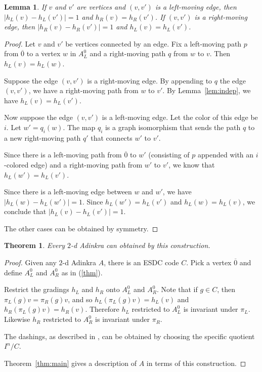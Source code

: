 \documentclass[12pt,twoside,singlespace]{article}
\numberwithin{equation}{section}
\newtheorem{thm}[equation]{Theorem}
\newtheorem{lem}[equation]{Lemma}
\theoremstyle{definition}
\begin{document}
\begin{lem}
If $v$ and $v'$ are vertices and $(v,v')$ is a left-moving edge, then
$|h_L(v)-h_L(v')|=1$ and $h_R(v)=h_R(v')$.  If $(v,v')$ is a right-moving edge, then $|h_R(v)-h_R(v')|=1$ and $h_L(v)=h_L(v')$.
\end{lem}

\begin{proof}
Let $v$ and $v'$ be vertices connected by an edge.  Fix a left-moving path $p$ from $\overline{0}$ to a vertex $w$ in $A_L^0$ and a right-moving path $q$ from $w$ to $v$.  Then $h_L(v)=h_L(w)$.

Suppose the edge $(v,v')$ is a right-moving edge.  By appending to $q$ the edge $(v,v')$, we have a right-moving path from $w$ to $v'$.  By Lemma~\ref{lem:indep}, we have $h_L(v)=h_L(v')$.

Now suppose the edge $(v,v')$ is a left-moving edge.  Let the color of this edge be $i$.  Let $w'=q_i(w)$.  The map $q_i$ is a graph isomorphism that sends the path $q$ to a new right-moving path $q'$ that connects $w'$ to $v'$.

Since there is a left-moving path from $\overline{0}$ to $w'$ (consisting of $p$ appended with an $i$-colored edge) and a right-moving path from $w'$ to $v'$, we know that $h_L(w')=h_L(v')$.  

Since there is a left-moving edge between $w$ and $w'$, we have $|h_L(w)-h_L(w')|=1$.  Since $h_L(w')=h_L(v')$ and $h_L(w)=h_L(v)$, we conclude that $|h_L(v)-h_L(v')|=1$.

The other cases can be obtained by symmetry.
\end{proof}


\begin{thm}
Every $2$-d Adinkra can obtained by this construction.
\end{thm}

\begin{proof}
Given any $2$-d Adinkra $A$, there is an ESDC code $C$.  Pick a vertex $\overline{0}$ and define $A_L^0$ and $A_R^0$ as in (\ref{thm}).

Restrict the gradings $h_L$ and $h_R$ onto $A_L^0$ and $A_R^0$.  Note that if $g\in C$, then $\pi_L(g)v=\pi_R(g)v$, and so $h_L(\pi_L(g)v)=h_L(v)$ and $h_R(\pi_L(g)v)=h_R(v)$.  Therefore $h_L$ restricted to $A_L^0$ is invariant under $\pi_L$.  Likewise $h_R$ restricted to $A_R^0$ is invariant under $\pi_R$.

The dashings, as described in \cite{rAT2}, can be obtained by choosing the specific quotient $I^n/C$.

Theorem~\ref{thm:main} gives a description of $A$ in terms of this construction.

\end{proof}
\end{document}
